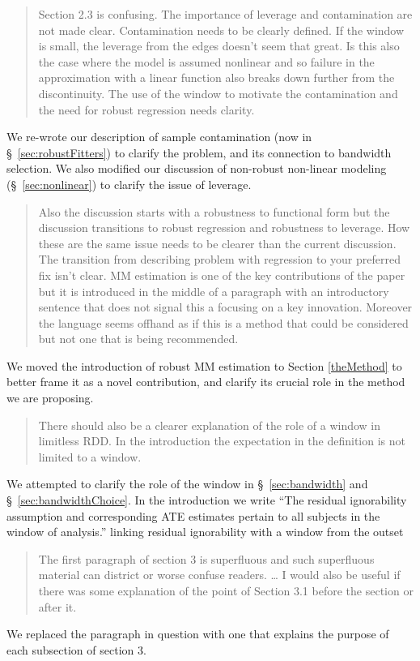 \documentclass[12pt]{article}
\begin{document}
\begin{quote}
Section 2.3 is confusing. The importance of leverage and contamination
are not made clear. Contamination needs to be clearly defined. If the
window is small, the leverage from the edges doesn’t seem that
great. Is this also the case where the model is assumed nonlinear and
so failure in the approximation with a linear function also breaks
down further from the discontinuity. The use of the window to motivate
the contamination and the need for robust regression needs clarity.
\end{quote}
We re-wrote our description of sample contamination (now in
\S~\ref{sec:robustFitters}) to clarify the problem, and its connection
to bandwidth selection.
We also modified our discussion of non-robust non-linear modeling
(\S~\ref{sec:nonlinear}) to clarify the issue of leverage.

\begin{quote}
Also the discussion starts with a robustness to functional form but
the discussion transitions to robust regression and robustness to
leverage. How these are the same issue needs to be clearer than the
current discussion. The transition from describing problem with
regression to your preferred fix isn’t clear. MM estimation is one of
the key contributions of the paper but it is introduced in the middle
of a paragraph with an introductory sentence that does not signal this
a focusing on a key innovation. Moreover the language seems offhand as
if this is a method that could be considered but not one that is being
recommended.
\end{quote}
We moved the introduction of robust MM estimation to Section
\ref{theMethod} to better frame it as a novel contribution, and
clarify its crucial role in the method we are proposing.

\begin{quote}
There should also be a clearer explanation of the role of a window in
limitless RDD. In the introduction the expectation in the definition
is not limited to a window.
\end{quote}
We attempted to clarify the role of the window in
\S~\ref{sec:bandwidth} and \S~\ref{sec:bandwidthChoice}. In the
introduction we write ``The residual ignorability assumption and corresponding ATE
estimates pertain to all subjects in the window of analysis.'' linking
residual ignorability with a window from the outset 

\begin{quote}
The first paragraph of section 3 is superfluous and such superfluous
material can district or worse confuse readers. \dots
I would also be useful if there
was some explanation of the point of Section 3.1 before the section or
after it.
\end{quote}
We replaced the paragraph in question with one that explains the
purpose of each subsection of section 3.
\end{document}
